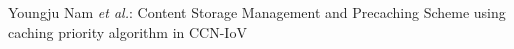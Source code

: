 \documentclass[journal]{IEEEtran}
\begin{document}
% 
%

%
{Youngju Nam \MakeLowercase{\textit{et al.}}: Content Storage Management and Precaching Scheme using caching priority algorithm in CCN-IoV}
% 



\maketitle
\end{document}
